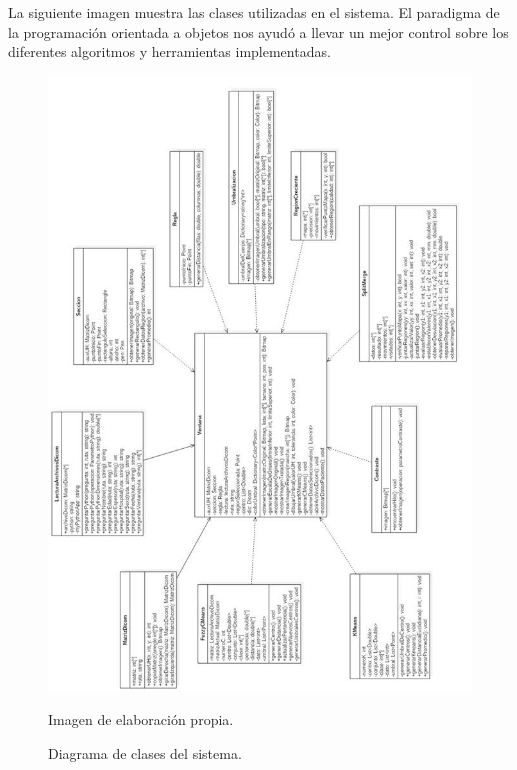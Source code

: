 \documentclass[12pt]{report}
\begin{document}
La siguiente imagen muestra las clases utilizadas en el sistema. El paradigma de la programación orientada a objetos nos ayudó a llevar un mejor control sobre los diferentes algoritmos y herramientas implementadas.
\newpage
\begin{figure}[H]
\centering
\includegraphics[width = 15 cm, height = 18 cm]{diagramaClases}
\caption{Diagrama de clases del sistema.}
Imagen de elaboración propia.
\end{figure}




\end{document}
